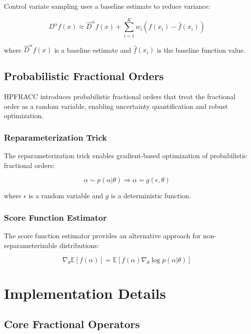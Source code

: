 \documentclass[12pt]{article}
\begin{document}
Control variate sampling uses a baseline estimate to reduce variance:

\begin{equation}
D^{\alpha}f(x) \approx \hat{D}^{\alpha}f(x) + \sum_{i=1}^{K} w_i (f(x_i) - \hat{f}(x_i))
\end{equation}

where $\hat{D}^{\alpha}f(x)$ is a baseline estimate and $\hat{f}(x_i)$ is the baseline function value.

\subsection{Probabilistic Fractional Orders}

HPFRACC introduces probabilistic fractional orders that treat the fractional order as a random variable, enabling uncertainty quantification and robust optimization.

\subsubsection{Reparameterization Trick}

The reparameterization trick enables gradient-based optimization of probabilistic fractional orders:

\begin{equation}
\alpha \sim p(\alpha|\theta) \Rightarrow \alpha = g(\epsilon, \theta)
\end{equation}

where $\epsilon$ is a random variable and $g$ is a deterministic function.

\subsubsection{Score Function Estimator}

The score function estimator provides an alternative approach for non-reparameterizable distributions:

\begin{equation}
\nabla_{\theta} \mathbb{E}[f(\alpha)] = \mathbb{E}[f(\alpha) \nabla_{\theta} \log p(\alpha|\theta)]
\end{equation}

\section{Implementation Details}

\subsection{Core Fractional Operators}
\end{document}
